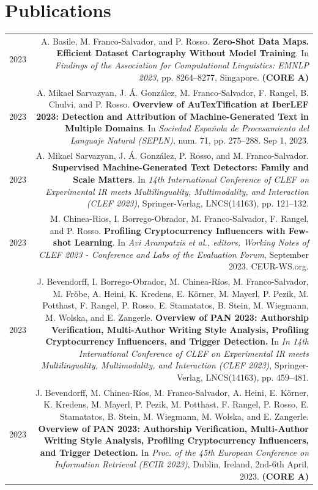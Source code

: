\documentclass[10pt]{article}
\begin{document}
\section*{Publications}
\begin{tabular}{L!{\VRule}R}
    2023 & A. Basile, M. Franco-Salvador, and P. Rosso. \textbf{Zero-Shot Data Maps. Efficient Dataset Cartography Without Model Training}. In \emph{Findings of the Association for Computational Linguistics: EMNLP 2023}, pp. 8264–8277, Singapore. \textbf{(CORE A)}  \vspace{5pt}\\
    2023 & A. Mikael Sarvazyan, J. Á. González, M. Franco-Salvador, F. Rangel, B. Chulvi, and P. Rosso. \textbf{Overview of AuTexTification at IberLEF 2023: Detection and Attribution of Machine-Generated Text in Multiple Domains}. In \emph{Sociedad Española de Procesamiento del Languaje Natural (SEPLN)}, num. 71, pp. 275--288. Sep 1, 2023. \vspace{5pt}\\
    2023 & A. Mikael Sarvazyan, J. Á. González, P. Rosso, and M. Franco-Salvador. \textbf{Supervised Machine-Generated Text Detectors: Family and Scale Matters}. In \emph{14th International Conference of CLEF on Experimental IR meets Multilinguality, Multimodality, and Interaction (CLEF 2023)}, Springer-Verlag, LNCS(14163), pp. 121--132. \vspace{5pt}\\
    2023 &  M. Chinea-Rios, I. Borrego-Obrador, M. Franco-Salvador, F. Rangel, and P. Rosso. \textbf{Profiling Cryptocurrency Influencers with Few-shot Learning}. In \emph{Avi Arampatzis et al., editors, Working Notes of CLEF 2023 - Conference and Labs of the Evaluation Forum}, September 2023. CEUR-WS.org. \vspace{5pt}\\
    2023 & J. Bevendorff, I. Borrego-Obrador, M. Chinea-Ríos, M. Franco-Salvador, M. Fröbe, A. Heini, K. Kredens, E. Körner, M. Mayerl, P. Pezik, M. Potthast, F. Rangel, P. Rosso, E. Stamatatos, B. Stein, M. Wiegmann, M. Wolska, and E. Zangerle. \textbf{Overview of PAN 2023: Authorship Verification, Multi-Author Writing Style Analysis, Profiling Cryptocurrency Influencers, and Trigger Detection.} In \emph{In 14th International Conference of CLEF on Experimental IR meets Multilinguality, Multimodality, and Interaction (CLEF 2023)}, Springer-Verlag, LNCS(14163), pp. 459--481. \vspace{5pt}\\
    2023 & J. Bevendorff, M. Chinea-Ríos, M. Franco-Salvador, A. Heini, E. Körner, K. Kredens, M. Mayerl, P. Pezik, M. Potthast, F. Rangel, P. Rosso, E. Stamatatos, B. Stein, M. Wiegmann, M. Wolska, and E. Zangerle. \textbf{Overview of PAN 2023: Authorship Verification, Multi-Author Writing Style Analysis, Profiling Cryptocurrency Influencers, and Trigger Detection.} In \emph{Proc. of the 45th European Conference on Information Retrieval (ECIR 2023)}, Dublin, Ireland, 2nd-6th April, 2023. \textbf{(CORE A)} \vspace{5pt}\\

\end{tabular}
\end{document}
